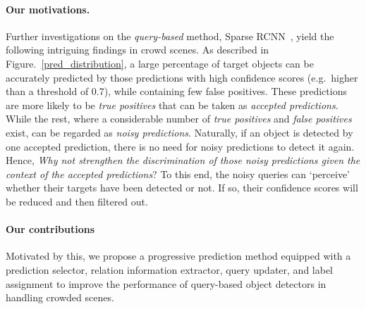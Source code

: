 \documentclass[final]{cvpr}
\begin{document}
\vspace{-0.5cm}
\paragraph{Our motivations.}

Further investigations on the \emph{query-based} method, Sparse RCNN~\cite{sun2020sparse}, yield the following intriguing findings in crowd scenes. 
As described in Figure.~\ref{pred_distribution}, a large percentage of target objects can be accurately predicted by those predictions with high confidence scores (e.g.\ higher than a threshold of 0.7), while containing few false positives. These predictions are more likely to be \emph{true positives} that can be taken as \emph{accepted predictions}. While the rest, where a considerable number of \emph{true positives} and \emph{false positives} exist, can be regarded as \emph{noisy predictions}.  Naturally, if an object is detected by one accepted prediction, there is no need for noisy predictions to detect it again. Hence, \emph{Why not strengthen the discrimination of those noisy predictions given the context of the accepted predictions}? To this end, the noisy queries can `perceive' whether their targets have been detected or not. If so, their confidence scores will be reduced and then filtered out.











\vspace{-0.5cm}
\paragraph{Our contributions}

Motivated by this, we propose a progressive prediction method equipped with a prediction selector, relation information extractor, query updater, and label assignment to improve the performance of query-based object detectors in handling crowded scenes. 
\end{document}
